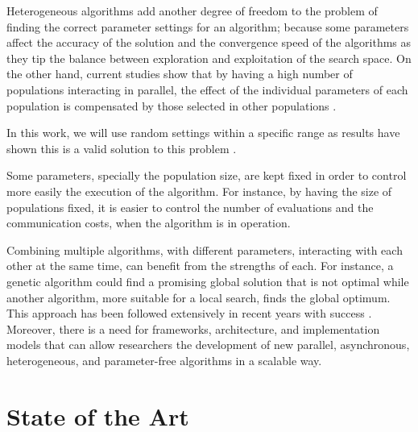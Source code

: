 \documentclass[review]{elsarticle}
\begin{document}
Heterogeneous algorithms add another degree of freedom to the problem of finding
the correct parameter settings for an algorithm; because some parameters affect
the accuracy of the solution and the convergence speed of the algorithms as they
tip the balance between exploration and exploitation of the search space. On the
other hand, current studies show that by having a high number of populations
interacting in parallel, the effect of the individual parameters of each
population is compensated by those selected in other
populations \cite{li2016multi,tanabe2013evaluation}. %

In this work, we will use random settings within a specific range as results have shown
this is a valid solution to this problem \cite{garcia2014randomized}. %

Some parameters, specially the population size, are
kept fixed in order to control more easily the execution of the algorithm. For
instance, by having the size of populations fixed, it is easier to control
the number of evaluations and the communication costs, when the algorithm is in
operation. %

Combining multiple algorithms, with different parameters, interacting with each
other at the same time, can benefit from the strengths of each. For instance, a
genetic algorithm could find a promising global solution that is not optimal
while another algorithm, more suitable for a local search, finds the global
optimum. This approach has been followed extensively in recent years with
success \cite{li2015multi,godio2016multi,biswas2014co}. 
Moreover, there is a need for frameworks, architecture, and
implementation models that can allow researchers the development of new
parallel, asynchronous, heterogeneous, and parameter-free algorithms in a scalable way.  

\section{State of the Art} 
\label{soa}
\end{document}
